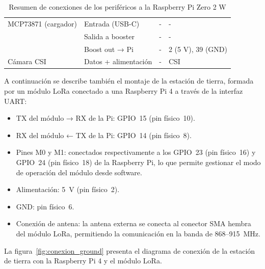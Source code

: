 \begin{table}[H]
\begin{tabular}{|l|l|l|l|}
        MCP73871 (cargador) & Entrada (USB-C)      & -             & -                   \\ \cline{2-4}
        & Salida a booster     & -             & -                   \\ \cline{2-4}
        & Boost out → Pi       & -             & 2 (5 V), 39 (GND)   \\ \hline
        Cámara CSI          & Datos + alimentación & -             & CSI                 \\ \hline
    \end{tabular}
    \caption{Resumen de conexiones de los periféricos a la Raspberry Pi Zero 2 W}
    \label{tab:resumen_conexiones}
\end{table}



A continuación se describe también el montaje de la estación de tierra, formada por un módulo LoRa conectado a una Raspberry Pi 4 a través de la interfaz UART:

\begin{itemize}
    \item TX del módulo → RX de la Pi: GPIO~15 (pin físico~10).
    \item RX del módulo ← TX de la Pi: GPIO~14 (pin físico~8).
    \item Pines M0 y M1: conectados respectivamente a los GPIO~23 (pin físico~16) y GPIO~24 (pin físico~18) de la Raspberry Pi, lo que permite gestionar el modo de operación del módulo desde software.
    \item Alimentación: 5~V (pin físico~2).
    \item GND: pin físico~6.
    \item Conexión de antena: la antena externa se conecta al conector SMA hembra del módulo LoRa, permitiendo la comunicación en la banda de 868–915~MHz.

\end{itemize}
La figura~\ref{fig:conexion_ground} presenta el diagrama de conexión de la estación de tierra con la Raspberry Pi 4 y el módulo LoRa.

